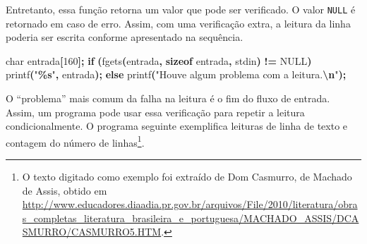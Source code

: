 \documentclass[
  11pt,
  a4paper,
]{scrbook}
\newenvironment{Shaded}{\begin{snugshade}}{\end{snugshade}}
\newcommand{\ControlFlowTok}[1]{\textcolor[rgb]{0.13,0.29,0.53}{\textbf{#1}}}
\newcommand{\DataTypeTok}[1]{\textcolor[rgb]{0.13,0.29,0.53}{#1}}
\newcommand{\DecValTok}[1]{\textcolor[rgb]{0.00,0.00,0.81}{#1}}
\newcommand{\KeywordTok}[1]{\textcolor[rgb]{0.13,0.29,0.53}{\textbf{#1}}}
\newcommand{\NormalTok}[1]{#1}
\newcommand{\OperatorTok}[1]{\textcolor[rgb]{0.81,0.36,0.00}{\textbf{#1}}}
\newcommand{\SpecialCharTok}[1]{\textcolor[rgb]{0.81,0.36,0.00}{\textbf{#1}}}
\newcommand{\StringTok}[1]{\textcolor[rgb]{0.31,0.60,0.02}{#1}}
\begin{document}
Entretanto, essa função retorna um valor que pode ser verificado. O
valor \texttt{NULL} é retornado em caso de erro. Assim, com uma
verificação extra, a leitura da linha poderia ser escrita conforme
apresentado na sequência.

\begin{Shaded}
\begin{Highlighting}[]
\DataTypeTok{char}\NormalTok{ entrada}\OperatorTok{[}\DecValTok{160}\OperatorTok{];}
\ControlFlowTok{if} \OperatorTok{(}\NormalTok{fgets}\OperatorTok{(}\NormalTok{entrada}\OperatorTok{,} \KeywordTok{sizeof}\NormalTok{ entrada}\OperatorTok{,}\NormalTok{ stdin}\OperatorTok{)} \OperatorTok{!=}\NormalTok{ NULL}\OperatorTok{)}
\NormalTok{    printf}\OperatorTok{(}\StringTok{"}\SpecialCharTok{\%s}\StringTok{"}\OperatorTok{,}\NormalTok{ entrada}\OperatorTok{);}
\ControlFlowTok{else}
\NormalTok{    printf}\OperatorTok{(}\StringTok{"Houve algum problema com a leitura.}\SpecialCharTok{\textbackslash{}n}\StringTok{"}\OperatorTok{);}
\end{Highlighting}
\end{Shaded}

O ``problema'' mais comum da falha na leitura é o fim do fluxo de
entrada. Assim, um programa pode usar essa verificação para repetir a
leitura condicionalmente. O programa seguinte exemplifica leituras de
linha de texto e contagem do número de linhas\footnote{O texto digitado
  como exemplo foi extraído de Dom Casmurro, de Machado de Assis, obtido
  em
  \url{http://www.educadores.diaadia.pr.gov.br/arquivos/File/2010/literatura/obras_completas_literatura_brasileira_e_portuguesa/MACHADO_ASSIS/DCASMURRO/CASMURRO5.HTM}.}.
\end{document}
